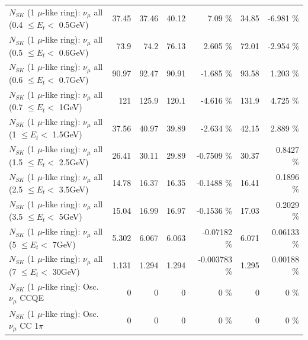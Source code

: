 \begin{table}
\begin{tabular}{| l | r | r | r  r | r  r |}
       $N_{SK}$ (1 $\mu$-like ring): $\nu_{\mu}$ all (0.4 $\leq E_{t} <$ 0.5GeV) &           37.45 &           37.46 &           40.12 &     7.09 \%  &           34.85 &   -6.981 \%  \\ 
       $N_{SK}$ (1 $\mu$-like ring): $\nu_{\mu}$ all (0.5 $\leq E_{t} <$ 0.6GeV) &            73.9 &            74.2 &           76.13 &    2.605 \%  &           72.01 &   -2.954 \%  \\ 
       $N_{SK}$ (1 $\mu$-like ring): $\nu_{\mu}$ all (0.6 $\leq E_{t} <$ 0.7GeV) &           90.97 &           92.47 &           90.91 &   -1.685 \%  &           93.58 &    1.203 \%  \\ 
         $N_{SK}$ (1 $\mu$-like ring): $\nu_{\mu}$ all (0.7 $\leq E_{t} <$ 1GeV) &             121 &           125.9 &           120.1 &   -4.616 \%  &           131.9 &    4.725 \%  \\ 
         $N_{SK}$ (1 $\mu$-like ring): $\nu_{\mu}$ all (1 $\leq E_{t} <$ 1.5GeV) &           37.56 &           40.97 &           39.89 &   -2.634 \%  &           42.15 &    2.889 \%  \\ 
       $N_{SK}$ (1 $\mu$-like ring): $\nu_{\mu}$ all (1.5 $\leq E_{t} <$ 2.5GeV) &           26.41 &           30.11 &           29.89 &  -0.7509 \%  &           30.37 &   0.8427 \%  \\ 
       $N_{SK}$ (1 $\mu$-like ring): $\nu_{\mu}$ all (2.5 $\leq E_{t} <$ 3.5GeV) &           14.78 &           16.37 &           16.35 &  -0.1488 \%  &           16.41 &   0.1896 \%  \\ 
         $N_{SK}$ (1 $\mu$-like ring): $\nu_{\mu}$ all (3.5 $\leq E_{t} <$ 5GeV) &           15.04 &           16.99 &           16.97 &  -0.1536 \%  &           17.03 &   0.2029 \%  \\ 
           $N_{SK}$ (1 $\mu$-like ring): $\nu_{\mu}$ all (5 $\leq E_{t} <$ 7GeV) &           5.302 &           6.067 &           6.063 & -0.07182 \%  &           6.071 &  0.06133 \%  \\ 
          $N_{SK}$ (1 $\mu$-like ring): $\nu_{\mu}$ all (7 $\leq E_{t} <$ 30GeV) &           1.131 &           1.294 &           1.294 & -0.003783 \%  &           1.295 &  0.00188 \%  \\ 
\hline
\hline
                               $N_{SK}$ (1 $\mu$-like ring): Osc. $\nu_\mu$ CCQE &               0 &               0 &               0 &        0 \%  &               0 &        0 \%  \\ 
                          $N_{SK}$ (1 $\mu$-like ring): Osc. $\nu_\mu$ CC 1$\pi$ &               0 &               0 &               0 &        0 \%  &               0 &        0 \%  \\ 

\end{tabular}
\end{table}
